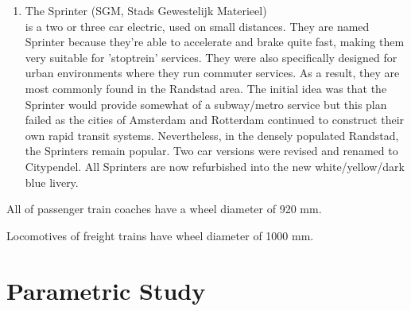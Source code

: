 \begin{enumerate}
    \item The Sprinter (SGM, Stads Gewestelijk Materieel) \\ is a two or three car electric, used on small distances. They are named Sprinter because they're able to accelerate and brake quite fast, making them very suitable for 'stoptrein' services. They were also specifically designed for urban environments where they run commuter services. As a result, they are most commonly found in the Randstad area. The initial idea was that the Sprinter would provide somewhat of a subway/metro service but this plan failed as the cities of Amsterdam and Rotterdam continued to construct their own rapid transit systems. Nevertheless, in the densely populated Randstad, the Sprinters remain popular. Two car versions were revised and renamed to Citypendel. All Sprinters are now refurbished into the new white/yellow/dark blue livery.
\end{enumerate}

All of passenger train coaches have a wheel diameter of 920 mm. 

Locomotives of freight trains have wheel diameter of 1000 mm.

\chapter{Parametric Study}




